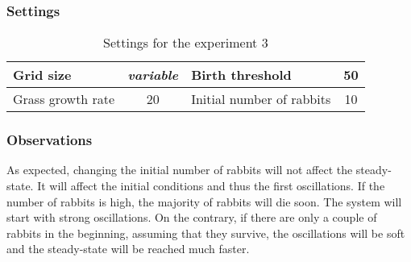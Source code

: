 \documentclass[11pt]{article}
\begin{document}
\subsubsection{Settings}

\begin{table}[H]
\centering
\begin{tabular}{|l|c||l|c|}
\hline
Grid size         & \textit{variable}   & Birth threshold           & 50    \\ \hline
Grass growth rate & 20                  & Initial number of rabbits & 10    \\ \hline
\end{tabular}
\caption{Settings for the experiment 3}
\end{table}

\subsubsection{Observations}
As expected, changing the initial number of rabbits will not affect the steady-state. It will affect the initial conditions and thus the first oscillations. If the number of rabbits is high, the majority of rabbits will die soon. The system will start with strong oscillations. On the contrary, if there are only a couple of rabbits in the beginning, assuming that they survive, the oscillations will be soft and the steady-state will be reached much faster.
\end{document}

